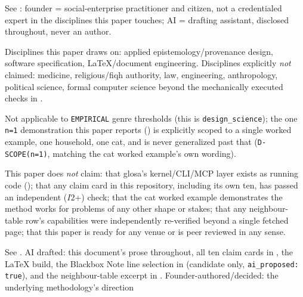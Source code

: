 
\begin{disclaimers}
  \item[D-STANDPOINT] See : founder = social-enterprise practitioner and
    citizen, not a credentialed expert in the disciplines this paper touches; AI = drafting
    assistant, disclosed throughout, never an author.
  \item[D-NONEXPERT] Disciplines this paper draws on: applied epistemology/provenance design,
    software specification, LaTeX/document engineering. Disciplines explicitly \emph{not} claimed:
    medicine, religious/fiqh authority, law, engineering, anthropology, political science, formal
    computer science beyond the mechanically executed checks in .
  \item[D-SCOPE] Not applicable to \texttt{EMPIRICAL} genre thresholds (this is
    \texttt{design\_science}); the one \texttt{n=1} demonstration this paper reports
    () is explicitly scoped to a single worked example, one household, one
    cat, and is never generalized past that (\texttt{D-SCOPE(n=1)}, matching the cat worked
    example's own wording).
  \item[D-NONCLAIM] This paper does \emph{not} claim: that glosa's kernel/CLI/MCP layer exists as
    running code (); that any claim card in this repository, including its own
    ten, has passed an independent ($I2$+) check; that the cat worked example demonstrates the
    method works for problems of any other shape or stakes; that any neighbour-table row's
    capabilities were independently re-verified beyond a single fetched page; that this paper is
    ready for any venue or is peer reviewed in any sense.
  \item[D-AIFILL] See . AI drafted: this document's prose throughout, all
    ten claim cards in , the LaTeX build, the Blackbox Note line selection
    in  (candidate only, \texttt{ai\_proposed: true}), and the neighbour-table
    excerpt in . Founder-authored/decided: the underlying methodology's direction

\end{disclaimers}
